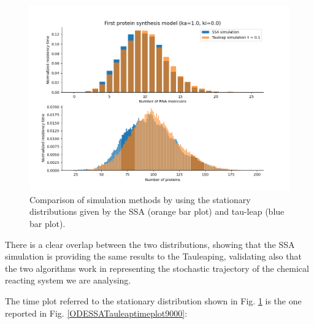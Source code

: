 \documentclass[12pt,a4paper]{report}
\begin{document}
\begin{figure}[!ht]
\centering
\includegraphics[scale=0.70]{RemovingwarmupSSA55.25sTauleap10.22stimelimit9000.png}
\caption{Comparison of simulation methods by using the stationary distributions given by the SSA (orange bar plot) and tau-leap (blue bar plot).}
\label{SSATauleapdistribution}
\end{figure}
\newpage
There is a clear overlap between the two distributions, showing that the SSA simulation is providing the same results to the Tauleaping, validating also that the two algorithms work in representing the stochastic trajectory of the chemical reacting system we are analysing.

The time plot referred to the stationary distribution shown in Fig. \ref{SSATauleapdistribution} is the one reported in Fig. \ref{ODESSATauleaptimeplot9000}: 
\end{document}
